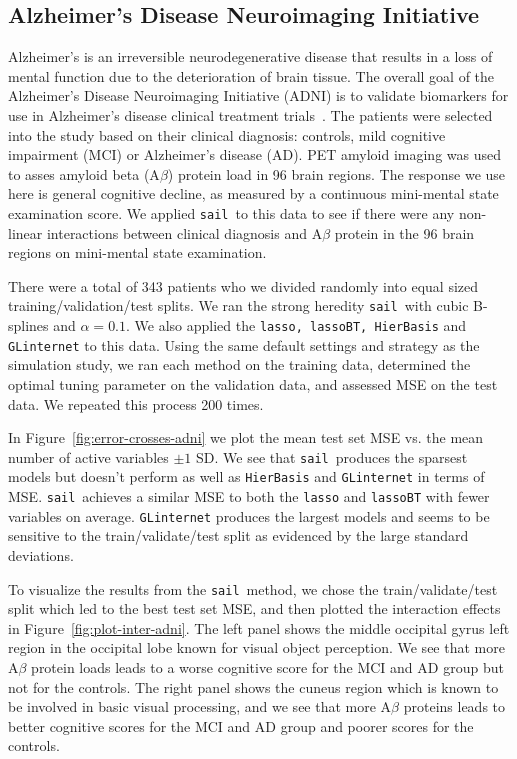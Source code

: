 \documentclass[12pt,letter]{article}\usepackage[]{graphicx}\usepackage[]{color}
\newcommand{\sail}{\texttt{sail}}
\begin{document}
\subsection{Alzheimer's Disease Neuroimaging Initiative}

Alzheimer's is an irreversible neurodegenerative disease that results in a loss of mental function due to the deterioration of brain tissue. The overall goal of the Alzheimer's Disease Neuroimaging Initiative (ADNI) is to validate biomarkers for use in
Alzheimer's disease clinical treatment trials~\citep{petersen2010alzheimer}. The patients were selected into the study based on their clinical diagnosis: controls, mild cognitive impairment (MCI) or Alzheimer's disease (AD). PET amyloid imaging was used to asses amyloid beta (A$\beta$) protein load in 96 brain regions. The response we use here is general cognitive decline, as measured by a continuous mini-mental state examination score. We applied \sail ~to this data to see if there were any non-linear interactions between clinical diagnosis and A$\beta$ protein in the 96 brain regions on mini-mental state examination. 

There were a total of 343 patients who we divided randomly into equal sized training/validation/test splits. We ran the strong heredity \sail ~with cubic B-splines and $\alpha=0.1$. We also applied the \texttt{lasso, lassoBT, HierBasis} and \texttt{GLinternet} to this data. Using the same default settings and strategy as the simulation study, we ran each method on the training data, determined the optimal tuning parameter on the validation data, and assessed MSE on the test data. We repeated this process 200 times. 







In Figure~\ref{fig:error-crosses-adni} we plot the mean test set MSE vs. the mean number of active variables $\pm 1$ SD. We see that \sail ~produces the sparsest models but doesn't perform as well as \texttt{HierBasis} and \texttt{GLinternet} in terms of MSE. \sail ~achieves a similar MSE to both the \texttt{lasso} and \texttt{lassoBT} with fewer variables on average. \texttt{GLinternet} produces the largest models and seems to be sensitive to the train/validate/test split as evidenced by the large standard deviations. 

To visualize the results from the \sail ~method, we chose the train/validate/test split which led to the best test set MSE, and then plotted the interaction effects in Figure~\ref{fig:plot-inter-adni}. The left panel shows the middle occipital gyrus left region in the occipital lobe known for visual object perception. We see that more A$\beta$ protein loads leads to a worse cognitive score for the MCI and AD group but not for the controls. The right panel shows the cuneus region which is known to be involved in basic visual processing, and we see that more A$\beta$ proteins leads to better cognitive scores for the MCI and AD group and poorer scores for the controls. 
\end{document}
